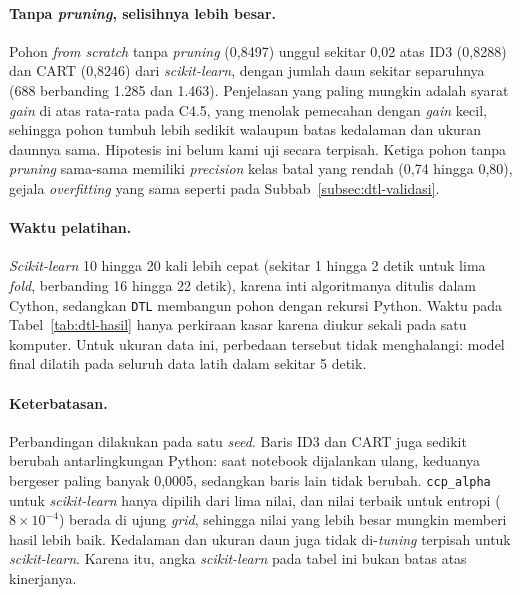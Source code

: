 \paragraph{Tanpa \textit{pruning}, selisihnya lebih besar.} Pohon \textit{from scratch} tanpa
\textit{pruning} (0,8497) unggul sekitar 0,02 atas ID3 (0,8288) dan CART (0,8246) dari
\textit{scikit-learn}, dengan jumlah daun sekitar separuhnya (688 berbanding 1.285 dan 1.463).
Penjelasan yang paling mungkin adalah syarat \textit{gain} di atas rata-rata pada C4.5, yang menolak
pemecahan dengan \textit{gain} kecil, sehingga pohon tumbuh lebih sedikit walaupun batas kedalaman
dan ukuran daunnya sama. Hipotesis ini belum kami uji secara terpisah. Ketiga pohon tanpa
\textit{pruning} sama-sama memiliki \textit{precision} kelas batal yang rendah (0,74 hingga 0,80),
gejala \textit{overfitting} yang sama seperti pada Subbab~\ref{subsec:dtl-validasi}.

\paragraph{Waktu pelatihan.} \textit{Scikit-learn} 10 hingga 20 kali lebih cepat (sekitar 1 hingga 2
detik untuk lima \textit{fold}, berbanding 16 hingga 22 detik), karena inti algoritmanya ditulis dalam
Cython, sedangkan \texttt{DTL} membangun pohon dengan rekursi Python. Waktu pada
Tabel~\ref{tab:dtl-hasil} hanya perkiraan kasar karena diukur sekali pada satu komputer. Untuk
ukuran data ini, perbedaan tersebut tidak menghalangi: model final dilatih pada seluruh data latih
dalam sekitar 5 detik.

\paragraph{Keterbatasan.} Perbandingan dilakukan pada satu \textit{seed}. Baris ID3 dan CART juga
sedikit berubah antarlingkungan Python: saat notebook dijalankan ulang, keduanya bergeser paling banyak
0,0005, sedangkan baris lain tidak berubah. \texttt{ccp\_alpha} untuk
\textit{scikit-learn} hanya dipilih dari lima nilai, dan nilai terbaik untuk entropi
($8 \times 10^{-4}$) berada di ujung \textit{grid}, sehingga nilai yang lebih besar mungkin memberi
hasil lebih baik. Kedalaman dan ukuran daun juga tidak di-\textit{tuning} terpisah untuk
\textit{scikit-learn}. Karena itu, angka \textit{scikit-learn} pada tabel ini bukan batas atas
kinerjanya.
